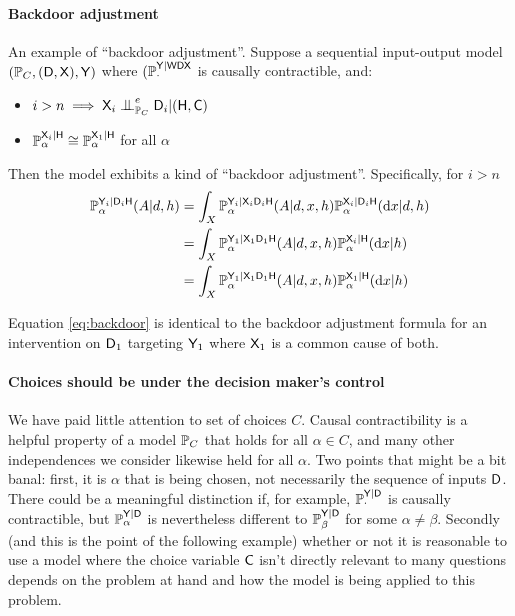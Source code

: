 \paragraph{Backdoor adjustment}

An example of ``backdoor adjustment''. Suppose a sequential input-output model $(\mathbb{P}_C,(\mathsf{D},\mathsf{X}),\mathsf{Y})$ where $(\mathbb{P}_\cdot^{\mathsf{Y}|\mathsf{WDX}}$ is causally contractible, and:
\begin{itemize}
    \item $i>n\implies \RV{X}_{i}\CI^e_{\prob{P}_C}\RV{D}_{i}|(\RV{H},\RV{C})$
    \item $\mathbb{P}_\alpha^{\mathsf{X}_{i}|\mathsf{H}}\cong \mathbb{P}_\alpha^{\mathsf{X}_{1}|\mathsf{H}}$ for all $\alpha$
 \end{itemize}
Then the model exhibits a kind of ``backdoor adjustment''. Specifically, for $i>n$
\begin{align}
    \mathbb{P}_\alpha^{\mathsf{Y}_{i}|\mathsf{D}_{i}\mathsf{H}}(A|d,h) &= \int_X \mathbb{P}_\alpha^{\mathsf{Y}_{i}|\mathsf{X}_{i}\mathsf{D}_{i}\mathsf{H}}(A|d,x,h)\mathbb{P}_\alpha^{\mathsf{X}_{i}|\mathsf{D}_{i}\mathsf{H}}(\mathrm{d}x|d,h)\\
    &= \int_X \mathbb{P}_\alpha^{\mathsf{Y}_{1}|\mathsf{X}_{1}\mathsf{D}_{1}\mathsf{H}}(A|d,x,h)\mathbb{P}_\alpha^{\mathsf{X}_{i}|\mathsf{H}}(\mathrm{d}x|h)\\
    &= \int_X \mathbb{P}_\alpha^{\mathsf{Y}_{1}|\mathsf{X}_{1}\mathsf{D}_{1}\mathsf{H}}(A|d,x,h)\mathbb{P}_\alpha^{\mathsf{X}_{1}|\mathsf{H}}(\mathrm{d}x|h)\label{eq:backdoor}
\end{align}

Equation \ref{eq:backdoor} is identical to the backdoor adjustment formula \citep[Chap. 1]{pearl_causality:_2009} for an intervention on $\mathsf{D}_1$ targeting $\mathsf{Y}_1$ where $\mathsf{X}_1$ is a common cause of both.

\paragraph{Choices should be under the decision maker's control}\label{sec:dm_control}

We have paid little attention to set of choices $C$. Causal contractibility is a helpful property of a model $\mathbb{P}_C$ that holds for all $\alpha\in C$, and many other independences we consider likewise held for all $\alpha$. Two points that might be a bit banal: first, it is $\alpha$ that is being chosen, not necessarily the sequence of inputs $\mathsf{D}$. There could be a meaningful distinction if, for example, $\mathbb{P}_\cdot^{\mathsf{Y}|\mathsf{D}}$ is causally contractible, but $\mathbb{P}_\alpha^{\mathsf{Y}|\mathsf{D}}$ is nevertheless different to $\mathbb{P}_\beta^{\mathsf{Y}|\mathsf{D}}$ for some $\alpha\neq\beta$. Secondly (and this is the point of the following example) whether or not it is reasonable to use a model where the choice variable $\mathsf{C}$ isn't directly relevant to many questions depends on the problem at hand and how the model is being applied to this problem. 

